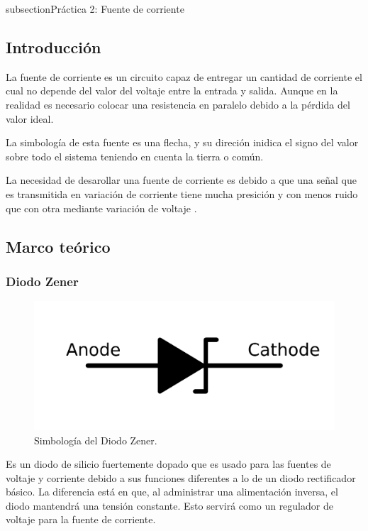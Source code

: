\clearpage

subsection{Práctica 2: Fuente de corriente}



\subsection{Introducción}
La fuente de corriente es un circuito capaz de entregar un cantidad de corriente el cual no depende del valor del voltaje entre la entrada y salida. Aunque en la realidad es necesario colocar una resistencia en paralelo debido a la pérdida del valor ideal.

La simbología de esta fuente es una flecha, y su direción inidica el signo del valor sobre todo el sistema teniendo en cuenta la tierra o común.

La necesidad de desarollar una fuente de corriente es debido a que una señal que es transmitida en variación de corriente tiene mucha presición y con menos ruido que con otra mediante variación de voltaje \parencite{routimo2007comparison}.

\subsection{Marco teórico}
\subsubsection*{Diodo Zener}

\begin{figure}[h]
    \centering
    \includegraphics[scale=0.2]{media/1024px-Zener_diode_symbol.svg.png}    
    \caption{Simbología del Diodo Zener.}
    \label{Fig: Simbologia del Diodo Zener}
\end{figure}


Es un diodo de silicio fuertemente dopado que es usado para las fuentes de voltaje y corriente debido a sus funciones 
diferentes a lo de un diodo rectificador básico. La diferencia está en que, al administrar una alimentación inversa, 
el diodo mantendrá una tensión constante. Esto servirá como un regulador de voltaje para la fuente de corriente.

